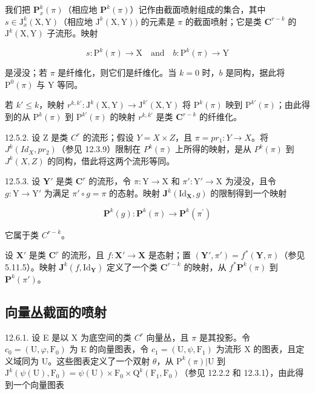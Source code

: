 我们把 \(\mathbf{P}_x^k (\pi)\)（相应地 \(\mathbf{P}^k (\pi)\)）记作由截面喷射组成的集合，其中 \(s\in \mathrm{J}_x^k (\mathrm{X},\mathrm{Y})\)（相应地 \(\mathrm{J}^k (\mathrm{X},\mathrm{Y}))\) 的元素是 \(\pi\) 的截面喷射；它是类 \(\mathbf{C}^{r - k}\) 的 \(\mathrm{J}^k (\mathrm{X},\mathrm{Y})\) 子流形。映射

\[
s \colon \mathrm{P} ^ {k} (\pi) \rightarrow \mathrm{X} \quad \text {and} \quad b \colon \mathrm{P} ^ {k} (\pi) \rightarrow \mathrm{Y}
\]

是浸没；若 \(\pi\) 是纤维化，则它们是纤维化。当 \(k=0\) 时，\(b\) 是同构，据此将 \(\mathrm{P}^{0}(\pi)\) 与 Y 等同。

若 \(k' \leqslant k\)，映射 \(r^{k, k'} : \mathrm{J}^k(\mathrm{X}, \mathrm{Y}) \to \mathrm{J}^{k'}(\mathrm{X}, \mathrm{Y})\) 将 \(\mathrm{P}^k(\pi)\) 映到 \(\mathrm{P}^{k'}(\pi)\)；由此得到的从 \(\mathrm{P}^k(\pi)\) 到 \(\mathrm{P}^{k'}(\pi)\) 的映射 \(r^{k, k'}\) 是类 \(\mathbf{C}^{r-k}\) 的纤维化。

12.5.2. 设 Z 是类 \(C^{r}\) 的流形；假设 \(Y = X \times Z\)，且 \(\pi = pr_{1}: Y \to X\)。将 \(J^{k}(Id_{X}, pr_{2})\)（参见 12.3.9）限制在 \(P^{k}(\pi)\) 上所得的映射，是从 \(P^{k}(\pi)\) 到 \(J^{k}(X, Z)\) 的同构，借此将这两个流形等同。

12.5.3. 设 \(\mathbf{Y}'\) 是类 \(\mathbf{C}^{r}\) 的流形，令 \(\pi: \mathrm{Y} \to \mathrm{X}\) 和 \(\pi': \mathrm{Y}' \to \mathrm{X}\) 为浸没，且令 \(g: \mathrm{Y} \to \mathrm{Y}'\) 为满足 \(\pi' \circ g = \pi\) 的态射。映射 \(\mathbf{J}^{k}(\mathrm{Id}_{\mathbf{X}},g)\) 的限制得到一个映射

\[
\mathbf {P} ^ {k} (g) \colon \mathbf {P} ^ {k} (\pi) \to \mathbf {P} ^ {k} (\pi^ {\prime})
\]

它属于类 \(C^{r-k}\)。

设 \(\mathbf{X}'\) 是类 \(\mathbf{C}^r\) 的流形，且 \(f: \mathbf{X}' \to \mathbf{X}\) 是态射；置 \((\mathbf{Y}', \pi') = f^*(\mathbf{Y}, \pi)\)（参见 5.11.5）。映射 \(\mathbf{J}^k(f, \mathrm{Id}_\mathbf{Y})\) 定义了一个类 \(\mathbf{C}^{r-k}\) 的映射，从 \(f^*\mathbf{P}^k(\pi)\) 到 \(\mathbf{P}^k(\pi')\)。

\subsection{向量丛截面的喷射}

12.6.1. 设 E 是以 X 为底空间的类 \(C^{r}\) 向量丛，且 \(\pi\) 是其投影。令 \(c_{0} = (\mathrm{U}, \varphi, \mathrm{F}_{0})\) 为 E 的向量图表，令 \(c_{1} = (\mathrm{U}, \psi, \mathrm{F}_{1})\) 为流形 X 的图表，且定义域同为 U。这些图表定义了一个双射 \(\theta\)，从 \(\mathrm{P}^{k}(\pi)|\mathrm{U}\) 到 \(\mathrm{J}^{k}(\psi(\mathrm{U}), \mathrm{F}_{0}) = \psi(\mathrm{U}) \times \mathrm{F}_{0} \times \mathrm{Q}^{k}(\mathrm{F}_{1}, \mathrm{F}_{0})\)（参见 12.2.2 和 12.3.1），由此得到一个向量图表

